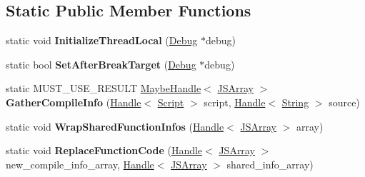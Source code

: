 \subsection*{Static Public Member Functions}
\begin{DoxyCompactItemize}
\item 
\hypertarget{classv8_1_1internal_1_1_live_edit_a9b5ea06802163d74690511e89f07cffd}{}static void {\bfseries Initialize\+Thread\+Local} (\hyperlink{classv8_1_1internal_1_1_debug}{Debug} $\ast$debug)\label{classv8_1_1internal_1_1_live_edit_a9b5ea06802163d74690511e89f07cffd}

\item 
\hypertarget{classv8_1_1internal_1_1_live_edit_a77e2a52e13a358d14489dea92851d3fb}{}static bool {\bfseries Set\+After\+Break\+Target} (\hyperlink{classv8_1_1internal_1_1_debug}{Debug} $\ast$debug)\label{classv8_1_1internal_1_1_live_edit_a77e2a52e13a358d14489dea92851d3fb}

\item 
\hypertarget{classv8_1_1internal_1_1_live_edit_a58e02c86ce01ee6f35fc20b1fad03086}{}static M\+U\+S\+T\+\_\+\+U\+S\+E\+\_\+\+R\+E\+S\+U\+L\+T \hyperlink{classv8_1_1internal_1_1_maybe_handle}{Maybe\+Handle}$<$ \hyperlink{classv8_1_1internal_1_1_j_s_array}{J\+S\+Array} $>$ {\bfseries Gather\+Compile\+Info} (\hyperlink{classv8_1_1internal_1_1_handle}{Handle}$<$ \hyperlink{classv8_1_1internal_1_1_script}{Script} $>$ script, \hyperlink{classv8_1_1internal_1_1_handle}{Handle}$<$ \hyperlink{classv8_1_1internal_1_1_string}{String} $>$ source)\label{classv8_1_1internal_1_1_live_edit_a58e02c86ce01ee6f35fc20b1fad03086}

\item 
\hypertarget{classv8_1_1internal_1_1_live_edit_aa639bf3eff6331c2b54b6e48db3976a7}{}static void {\bfseries Wrap\+Shared\+Function\+Infos} (\hyperlink{classv8_1_1internal_1_1_handle}{Handle}$<$ \hyperlink{classv8_1_1internal_1_1_j_s_array}{J\+S\+Array} $>$ array)\label{classv8_1_1internal_1_1_live_edit_aa639bf3eff6331c2b54b6e48db3976a7}

\item 
\hypertarget{classv8_1_1internal_1_1_live_edit_a6da6ace56f1979c43e01b5fd697a06ae}{}static void {\bfseries Replace\+Function\+Code} (\hyperlink{classv8_1_1internal_1_1_handle}{Handle}$<$ \hyperlink{classv8_1_1internal_1_1_j_s_array}{J\+S\+Array} $>$ new\+\_\+compile\+\_\+info\+\_\+array, \hyperlink{classv8_1_1internal_1_1_handle}{Handle}$<$ \hyperlink{classv8_1_1internal_1_1_j_s_array}{J\+S\+Array} $>$ shared\+\_\+info\+\_\+array)\label{classv8_1_1internal_1_1_live_edit_a6da6ace56f1979c43e01b5fd697a06ae}


\end{DoxyCompactItemize}

